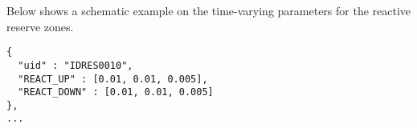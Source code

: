 Below shows a schematic example on the time-varying parameters for the reactive reserve zones.
\begin{verbatim}
{
  "uid" : "IDRES0010",
  "REACT_UP" : [0.01, 0.01, 0.005],
  "REACT_DOWN" : [0.01, 0.01, 0.005]
},
...
\end{verbatim}




